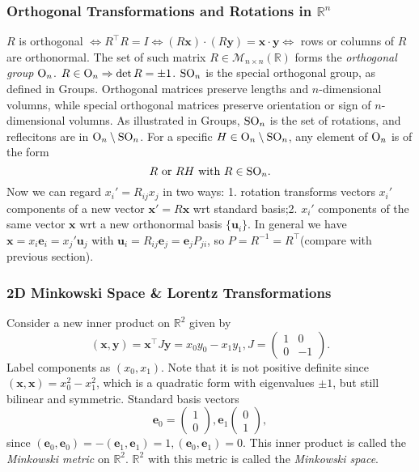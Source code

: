 \documentclass[a4paper]{article}
\begin{document}
    \subsubsection{Orthogonal Transformations and Rotations in $
    \mathbb{R}^{n} $}
    $ R $ is orthogonal $ \Leftrightarrow R^\top R=I \Leftrightarrow
    (R\mathbf{x})\cdot (R\mathbf{y})=\mathbf{x} \cdot \mathbf{y}
    \Leftrightarrow  $ rows or columns of $R$ are orthonormal. The
    set of such matrix $ R\in \mathcal{M}_{n\times n}(\mathbb{R}) $
    forms the \textit{orthogonal group} $ \mathrm{O}_n $. $ R\in \mathrm{O}_n
    \Rightarrow \det R=\pm 1 $. $ \mathrm{SO}_n $ is the special orthogonal
    group, as defined in Groups. Orthogonal matrices preserve lengths
    and $n$-dimensional volumns, while special orthogonal matrices
    preserve orientation or sign of $n$-dimensional volumns. As
    illustrated in Groups, $\mathrm{SO}_n$ is the set of rotations, and
    reflecitons are in $ \mathrm{O}_n \setminus \mathrm{SO}_n $. For a specific
    $H\in \mathrm{O}_n \setminus \mathrm{SO}_n$, any element of $\mathrm{O}_n$ is of the form
    \[
      R \text{ or } RH \text{ with }R\in \mathrm{SO}_n.
    \]
    Now we can regard $ x_i'=R_{ij}x_j $ in two ways: 1. rotation
    transforms vectors $x_i'$ components of a new vector $
    \mathbf{x}'=R\mathbf{x} $ wrt standard basis;2. $ x_i' $
    components of the same vector $\mathbf{x}$ wrt a new orthonormal
    basis $ \{\mathbf{u}_i\} $. In general we have $
    \mathbf{x}=x_i\mathbf{e}_i=x_j'\mathbf{u}_j $ with $
    \mathbf{u}_i=R_{ij}\mathbf{e}_j=\mathbf{e}_jP_{ji} $, so $
    P=R^{-1}=R^\top $(compare with previous section).
    \subsubsection{2D Minkowski Space \& Lorentz Transformations}
    Consider a new inner product on $ \mathbb{R}^{2} $ given by
    \[
      (\mathbf{x},\mathbf{y})=\mathbf{x}^\top J \mathbf{y}=x_0y_0-x_1y_1,J=
      \begin{pmatrix}
        1&0\\
        0&-1
      \end{pmatrix}.
    \]
    Label components as $ (x_0,x_1) $. Note that it is not positive
    definite since $ (\mathbf{x},\mathbf{x})=x_0^2-x_1^2 $, which is
    a quadratic form with eigenvalues $ \pm 1 $, but still bilinear
    and symmetric. Standard basis vectors
    \[
      \mathbf{e}_0=
      \begin{pmatrix}
        1\\0
      \end{pmatrix},\mathbf{e}_1
      \begin{pmatrix}
        0\\1
      \end{pmatrix},
    \]
    since $
    (\mathbf{e}_0,\mathbf{e}_0)=-(\mathbf{e}_1,\mathbf{e}_1)=1,
    (\mathbf{e}_0,\mathbf{e}_1)=0 $. This inner product is called the
    \textit{Minkowski metric }on $ \mathbb{R}^{2} $. $ \mathbb{R}^{2}
    $ with this metric is called the \textit{Minkowski space}.
\end{document}
